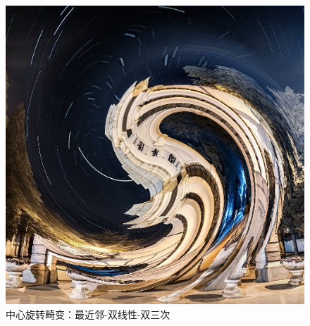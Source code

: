 \documentclass[UTF8]{ctexart}
\begin{document}
\begin{figure}[H]
    \includegraphics[scale=0.2]{../images/report-images/tangent_distortionbicub.png}
    \caption{中心旋转畸变：最近邻-双线性-双三次}
\end{figure}
\end{document}
